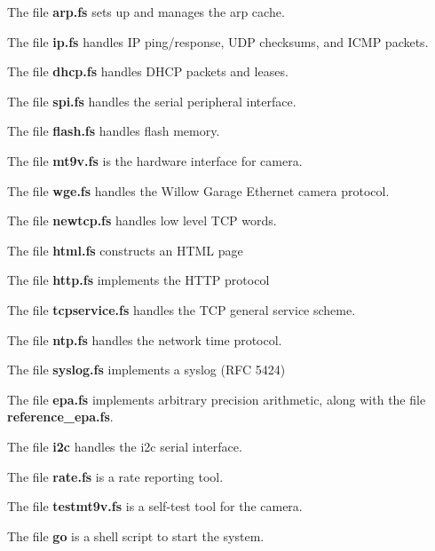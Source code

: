 The file {\bf arp.fs} sets up and manages the arp cache.

The file {\bf ip.fs} handles IP ping/response, UDP checksums,
and ICMP packets.

The file {\bf dhcp.fs} handles DHCP packets and leases.

The file {\bf spi.fs} handles the serial peripheral interface.

The file {\bf flash.fs} handles flash memory.

The file {\bf mt9v.fs} is the hardware interface for camera.

The file {\bf wge.fs} handles the Willow Garage Ethernet camera protocol.

The file {\bf newtcp.fs} handles low level TCP words.

The file {\bf html.fs} constructs an HTML page

The file {\bf http.fs} implements the HTTP protocol

The file {\bf tcpservice.fs} handles the TCP general service scheme.

The file {\bf ntp.fs} handles the network time protocol.

The file {\bf syslog.fs} implements a syslog (RFC 5424)

The file {\bf epa.fs} implements arbitrary precision arithmetic,
along with the file {\bf reference\_epa.fs}.

The file {\bf i2c} handles the i2c serial interface.

The file {\bf rate.fs} is a rate reporting tool.

The file {\bf testmt9v.fs} is a self-test tool for the camera.

The file {\bf go} is a shell script to start the system.

